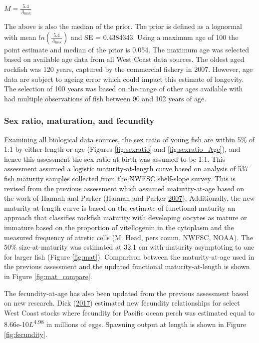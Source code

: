 \documentclass[12pt,]{article}
\begin{document}
\begin{centering}

$M=\frac{5.4}{A_{\text{max}}}$

\end{centering}

The above is also the median of the prior. The prior is defined as a
lognormal with mean \(ln(\frac{5.4}{A_{\text{max}}})\) and SE =
0.4384343. Using a maximum age of 100 the point estimate and median of
the prior is 0.054. The maximum age was selected based on available age
data from all West Coast data sources. The oldest aged rockfish was 120
years, captured by the commercial fishery in 2007. However, age data are
subject to ageing error which could impact this estimate of longevity.
The selection of 100 years was based on the range of other ages
available with had multiple observations of fish between 90 and 102
years of age.

\subsubsection{Sex ratio, maturation, and
fecundity}\label{sex-ratio-maturation-and-fecundity}

Examining all biological data sources, the sex ratio of young fish are
within 5\% of 1:1 by either length or age (Figures \ref{fig:sexratio}
and \ref{fig:sexratio_Age}), and hence this assessment the sex ratio at
birth was assumed to be 1:1. This assessment assumed a logistic
maturity-at-length curve based on analysis of 537 fish maturity samples
collected from the NWFSC shelf-slope survey. This is revised from the
previous assessment which assumed maturity-at-age based on the work of
Hannah and Parker (Hannah and Parker
\protect\hyperlink{ref-hannah_age-modulated_2007}{2007}). Additionally,
the new maturity-at-length curve is based on the estimate of functional
maturity an approach that classifies rockfish maturity with developing
oocytes as mature or immature based on the proportion of vitellogenin in
the cytoplasm and the measured frequency of atretic cells (M. Head, pers
comm, NWFSC, NOAA). The 50\% size-at-maturity was estimated at 32.1 cm
with maturity asymptoting to one for larger fish (Figure \ref{fig:mat}).
Comparison between the maturity-at-age used in the previous assessment
and the updated functional maturity-at-length is shown in Figure
\ref{fig:mat_compare}.

The fecundity-at-age has also been updated from the previous assessment
based on new research. Dick
(\protect\hyperlink{ref-dick_meta-analysis_2017}{2017}) estimated new
fecundity relationships for select West Coast stocks where fecundity for
Pacific ocean perch was estimated equal to
8.66e-10\(L\)\textsuperscript{4.98} in millions of eggs. Spawning output
at length is shown in Figure \ref{fig:fecundity}.
\end{document}
